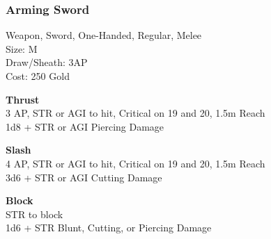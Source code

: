 \subsubsection{Arming Sword}\label{weapon:armingSword}
Weapon, Sword, One-Handed, Regular, Melee\\
Size: M\\
Draw/Sheath: 3AP\\
Cost: 250 Gold

\textbf{Thrust}\\
3 AP, STR or AGI to hit, Critical on 19 and 20, 1.5m Reach\\
1d8 + \texttimes STR or AGI Piercing Damage

\textbf{Slash}\\
4 AP, STR or AGI to hit, Critical on 19 and 20, 1.5m Reach\\
3d6 + \texttimes STR or AGI Cutting Damage

\textbf{Block}\\
STR to block\\
1d6 + \texttimes STR Blunt, Cutting, or Piercing Damage
